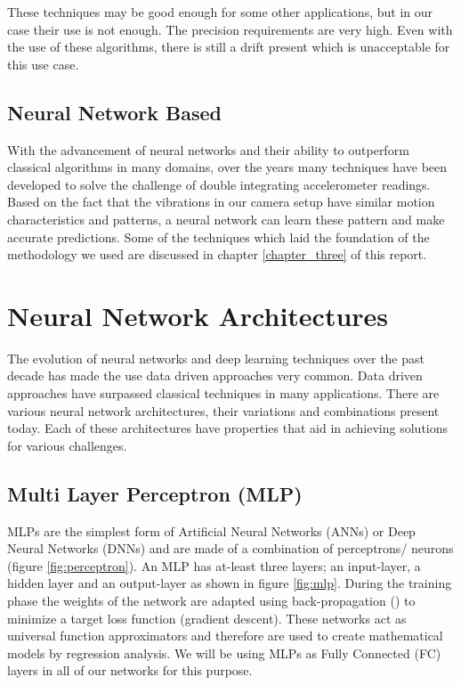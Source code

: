 These techniques may be good enough for some other applications, but in our case their use is not enough. The precision requirements are very high. Even with the use of these algorithms, there is still a drift present which is unacceptable for this use case.

\subsection{Neural Network Based}
With the advancement of neural networks and their ability to outperform classical algorithms in many domains, over the years many techniques have been developed to solve the challenge of double integrating accelerometer readings. Based on the fact that the vibrations in our camera setup have similar motion characteristics and patterns, a neural network can learn these pattern and make accurate predictions. Some of the techniques which laid the foundation of the methodology we used are discussed in chapter \ref{chapter_three} of this report.


\section{Neural Network Architectures}
The evolution of neural networks and deep learning techniques over the past decade has made the use data driven approaches very common. Data driven approaches have surpassed classical techniques in many applications. There are various neural network architectures, their variations and combinations present today. Each of these architectures have properties that aid in achieving solutions for various challenges.

\subsection{Multi Layer Perceptron (MLP)}
MLPs are the simplest form of Artificial Neural Networks (ANNs) or Deep Neural Networks (DNNs) and are made of a combination of perceptrons/ neurons (figure \ref{fig:perceptron}). An MLP has at-least three layers; an input-layer, a hidden layer and an output-layer as shown in figure \ref{fig:mlp}. During the training phase the weights of the network are adapted using back-propagation (\citep{rumelhart1986learning}) to minimize a target loss function (gradient descent). These networks act as universal function approximators \citep{cybenko1989approximation} and therefore are used to create mathematical models by regression analysis. We will be using MLPs as Fully Connected (FC) layers in all of our networks for this purpose.


